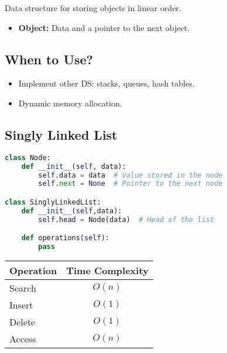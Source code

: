 \begin{summary}
    Data structure for storing objects in linear order. 
    \begin{itemize}
        \item \textbf{Object:} Data and a pointer to the next object. 
    \end{itemize}    
\end{summary}

\subsection{When to Use?}
\begin{summary}
    \begin{itemize}
        \item Implement other DS: stacks, queues, hash tables. 
        \item Dynamic memory allocation. 
    \end{itemize}
\end{summary}

\subsection{Singly Linked List}
\begin{algo}
\begin{lstlisting}[language=Python, caption=Singly Linked List in Python]
class Node:
    def __init__(self, data):
        self.data = data  # Value stored in the node
        self.next = None  # Pointer to the next node

class SinglyLinkedList:
    def __init__(self,data):
        self.head = Node(data)  # Head of the list

    def operations(self):
        pass
\end{lstlisting}
        
\end{algo}
\begin{summary}
    \begin{center}
        \begin{tabular}{lc}
            \toprule
            \textbf{Operation} & \textbf{Time Complexity} \\
            \midrule
            Search & $O(n)$ \\
            Insert & $O(1)$ \\
            Delete & $O(1)$ \\
            Access & $O(n)$ \\
            \bottomrule
        \end{tabular}
    \end{center}
\end{summary}

